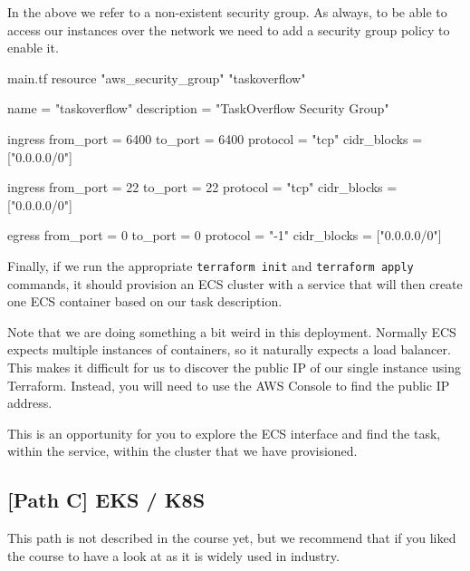 \documentclass{csse4400}
\begin{document}
In the above we refer to a non-existent security group.
As always, to be able to access our instances over the network we need to add a security group policy to enable it.

\begin{code}[language=terraform,numbers=none]{main.tf}
resource "aws_security_group" "taskoverflow" {
    name = "taskoverflow"
    description = "TaskOverflow Security Group"
  
    ingress {
      from_port = 6400
      to_port = 6400
      protocol = "tcp"
      cidr_blocks = ["0.0.0.0/0"]
    }
  
    ingress {
      from_port = 22
      to_port = 22
      protocol = "tcp"
      cidr_blocks = ["0.0.0.0/0"]
    }
  
    egress {
      from_port = 0
      to_port = 0
      protocol = "-1"
      cidr_blocks = ["0.0.0.0/0"]
    }
}
\end{code}

Finally, if we run the appropriate \texttt{terraform init} and \texttt{terraform apply} commands,
it should provision an ECS cluster with a service that will then create one ECS container based on our task description.

Note that we are doing something a bit weird in this deployment.
Normally ECS expects multiple instances of containers,
so it naturally expects a load balancer.
This makes it difficult for us to discover the public IP of our single instance using Terraform.
Instead, you will need to use the AWS Console to find the public IP address.

This is an opportunity for you to explore the ECS interface and find the task, within the service, within the cluster that we have provisioned.

\subsection{[Path C] EKS / K8S}

This path is not described in the course yet,
but we recommend that if you liked the course to have a look at  as it is widely used in industry.



\end{document}
